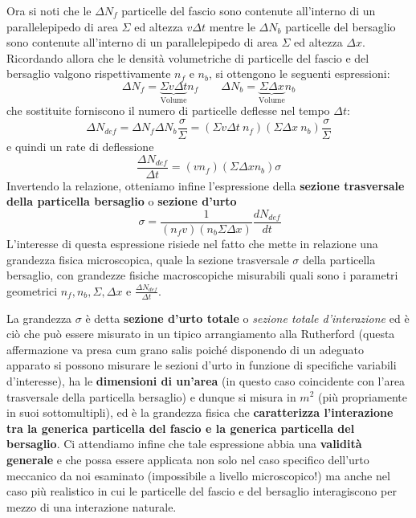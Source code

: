 Ora si noti che le \(\Delta N_f\) particelle del fascio sono contenute
all'interno di un parallelepipedo di area \(\Sigma\) ed altezza
\(v \Delta t\) mentre le \(\Delta N_b\) particelle del bersaglio sono
contenute all'interno di un parallelepipedo di area \(\Sigma\) ed
altezza \(\Delta x\).
Ricordando allora che le densità volumetriche di particelle del fascio e del bersaglio valgono
rispettivamente \(n_f\) e \(n_b\), si ottengono le seguenti espressioni:
\[
	\Delta N_f = \underbrace{\Sigma v \Delta t}_{ \text{Volume}}n_f
	\qquad
	\Delta N_b = \underbrace{\Sigma  \Delta x}_{ \text{Volume}}n_b
\]
che sostituite forniscono il numero di particelle deflesse nel tempo
\(\Delta t\):
\[
	\Delta N_{def} = \Delta N_f \Delta N_b \frac{\sigma}{\Sigma} =
	(\Sigma v \Delta t \ n_f)(\Sigma \Delta x \ n_b)\frac{\sigma}{\Sigma}
\]
e quindi un rate di deflessione
\[
	\frac{\Delta N_{def}}{\Delta t} = (v n_f)( \Sigma \Delta x n_b) \sigma
\] Invertendo la relazione, otteniamo infine l'espressione della
\textbf{sezione trasversale della particella bersaglio} o
\textbf{sezione d'urto}
\begin{equation}
	\boxed{\  \sigma = \frac{1}{(n_fv)(n_b \Sigma \Delta x)}\frac{dN_{def}}{dt} }
	\label{eq:cross-section-def}
\end{equation}
L'interesse di questa espressione risiede nel fatto che mette in
relazione una grandezza fisica microscopica, quale la sezione
trasversale \(\sigma\) della particella bersaglio, con grandezze fisiche
macroscopiche misurabili quali sono i parametri geometrici
\(n_f,n_b,\Sigma,\Delta x\) e \(\frac{\Delta N_{def}}{\Delta t}\).

La grandezza \(\sigma\) è detta \textbf{sezione d'urto totale} o \emph{sezione
totale d'interazione} ed è ciò che può essere misurato in un tipico
arrangiamento alla Rutherford (questa affermazione va presa cum grano
salis poiché disponendo di un adeguato apparato si possono misurare le
sezioni d'urto in funzione di specifiche variabili d'interesse), ha le
\textbf{dimensioni di un'area} (in questo caso coincidente con l'area
trasversale della particella bersaglio) e dunque si misura in
\(m^2\) (più propriamente in suoi sottomultipli), ed è la grandezza
fisica che \textbf{caratterizza l'interazione tra la generica particella
del fascio e la generica particella del bersaglio}.
Ci attendiamo infine che tale espressione abbia una \textbf{validità generale} e che possa
essere applicata non solo nel caso specifico dell'urto meccanico da noi
esaminato (impossibile a livello microscopico!) ma anche nel caso più
realistico in cui le particelle del fascio e del bersaglio interagiscono
per mezzo di una interazione naturale.

